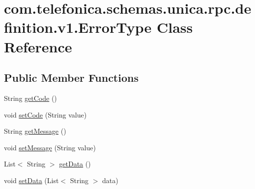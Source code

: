 \hypertarget{classcom_1_1telefonica_1_1schemas_1_1unica_1_1rpc_1_1definition_1_1v1_1_1ErrorType}{
\section{com.telefonica.schemas.unica.rpc.definition.v1.ErrorType Class Reference}
\label{classcom_1_1telefonica_1_1schemas_1_1unica_1_1rpc_1_1definition_1_1v1_1_1ErrorType}
}
\subsection*{Public Member Functions}
\begin{DoxyCompactItemize}
\item 
String \hyperlink{classcom_1_1telefonica_1_1schemas_1_1unica_1_1rpc_1_1definition_1_1v1_1_1ErrorType_a1a5251bdee57caa557cdb5b05af42114}{getCode} ()
\item 
void \hyperlink{classcom_1_1telefonica_1_1schemas_1_1unica_1_1rpc_1_1definition_1_1v1_1_1ErrorType_a086ab2207da47f736395e2e21b31a54d}{setCode} (String value)
\item 
String \hyperlink{classcom_1_1telefonica_1_1schemas_1_1unica_1_1rpc_1_1definition_1_1v1_1_1ErrorType_abc3db4b21c3b2ee64d9341714a813cda}{getMessage} ()
\item 
void \hyperlink{classcom_1_1telefonica_1_1schemas_1_1unica_1_1rpc_1_1definition_1_1v1_1_1ErrorType_a292d9a93654b66ca34e485a453f663eb}{setMessage} (String value)
\item 
List$<$ String $>$ \hyperlink{classcom_1_1telefonica_1_1schemas_1_1unica_1_1rpc_1_1definition_1_1v1_1_1ErrorType_a51b15462df050a27e3bb25b6eec42659}{getData} ()
\item 
void \hyperlink{classcom_1_1telefonica_1_1schemas_1_1unica_1_1rpc_1_1definition_1_1v1_1_1ErrorType_ac7cc841328b6d513f7379581c53cd658}{setData} (List$<$ String $>$ data)
\end{DoxyCompactItemize}
